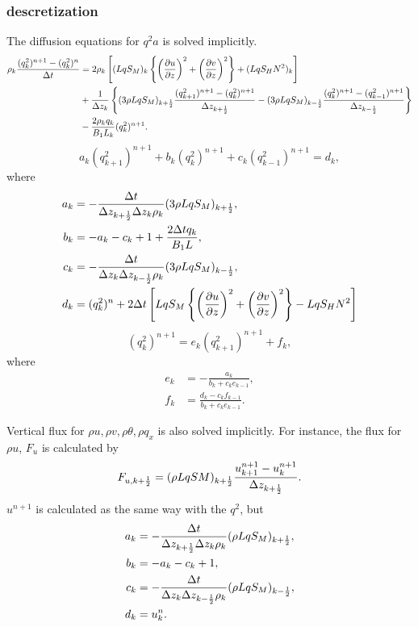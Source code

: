 \subsubsection{descretization}
The diffusion equations for $q^2a$ is solved implicitly.
\begin{align}
  \rho_k \frac{(q^2_k)^{n+1}-(q^2_k)^n}{\Delta t}
  &= 
  2\rho_k \left[ (LqS_M)_k\left\{\left(\frac{\partial u}{\partial z}\right)^2+\left(\frac{\partial v}{\partial z}\right)^2\right\} + (LqS_HN^2)_k \right] \nonumber \\
  &+ \frac{1}{\Delta z_k}\left\{ (3\rho LqS_M)_{k+\frac{1}{2}} \frac{(q^2_{k+1})^{n+1}-(q^2_k)^{n+1}}{\Delta z_{k+\frac{1}{2}}} - (3\rho LqS_M)_{k-\frac{1}{2}} \frac{(q^2_k)^{n+1}-(q^2_{k-1})^{n+1}}{\Delta z_{k-\frac{1}{2}}} \right\} \nonumber \\
  &-\frac{2\rho_k q_k}{B_1L_k}(q^2_k)^{n+1}.
\end{align}
\begin{equation}
  a_k (q^2_{k+1})^{n+1} + b_k (q^2_k)^{n+1} + c_k (q^2_{k-1})^{n+1} = d_k,
\end{equation}
where
\begin{align}
  a_k &= -\frac{\Delta t}{\Delta z_{k+\frac{1}{2}}\Delta z_k\rho_k}(3\rho LqS_M)_{k+\frac{1}{2}}, \\
  b_k &= -a_k - c_k + 1 + \frac{2\Delta tq_k}{B_1L}, \\
  c_k &= -\frac{\Delta t}{\Delta z_k\Delta z_{k-\frac{1}{2}}\rho_k}(3\rho LqS_M)_{k-\frac{1}{2}}, \\
  d_k &= (q^2_k)^n + 2\Delta t \left[ LqS_M\left\{\left(\frac{\partial u}{\partial z}\right)^2+\left(\frac{\partial v}{\partial z}\right)^2\right\} - LqS_HN^2 \right]
\end{align}
\begin{equation}
  (q^2_k)^{n+1} = e_k (q^2_{k+1})^{n+1} + f_k,
\end{equation}
where
\begin{align}
  e_k &= -\frac{a_k}{b_k+c_ke_{k-1}}, \\
  f_k &= \frac{d_k-c_kf_{k-1}}{b_k+c_ke_{k-1}}.
\end{align}

Vertical flux for $\rho u, \rho v, \rho\theta, \rho q_x$ is also solved implicitly.
For instance, the flux for $\rho u$, $F_u$ is calculated by
\begin{equation}
  F_{u,k+\frac{1}{2}} = (\rho LqSM)_{k+\frac{1}{2}}\frac{u^{n+1}_{k+1}-u^{n+1}_k}{\Delta z_{k+\frac{1}{2}}}.
\end{equation}
$u^{n+1}$ is calculated as the same way with the $q^2$, but
\begin{align}
  a_k &= -\frac{\Delta t}{\Delta z_{k+\frac{1}{2}}\Delta z_k\rho_k}(\rho LqS_M)_{k+\frac{1}{2}}, \\
  b_k &= -a_k - c_k + 1, \\
  c_k &= -\frac{\Delta t}{\Delta z_k\Delta z_{k-\frac{1}{2}}\rho_k}(\rho LqS_M)_{k-\frac{1}{2}}, \\
  d_k &= u_k^n.
\end{align}

%
